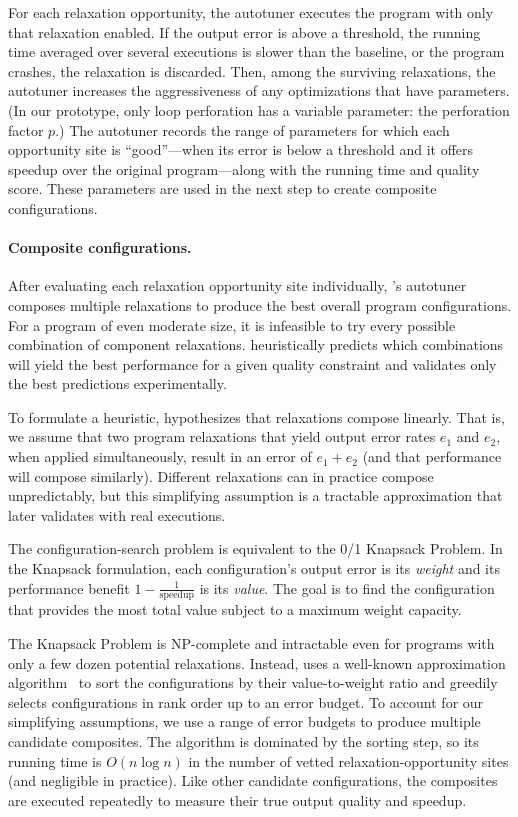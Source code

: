For each relaxation opportunity, the autotuner executes the program
with only that relaxation enabled.
If the output error is above a threshold, the running time averaged over
several executions is slower than the baseline,
or the program crashes, the relaxation is discarded.
Then, among the surviving relaxations, the autotuner increases the
aggressiveness of any optimizations that have parameters.
(In our prototype, only loop perforation has a variable
parameter: the perforation factor $p$.)
The autotuner records the range of parameters for which each opportunity site
is ``good''---when its error is below a threshold and it offers
speedup over the original program---along with the running time and
quality score.
These parameters are used in the next step to create composite configurations.

\paragraph{Composite configurations.}

After evaluating each relaxation opportunity site individually, \sysname's
autotuner composes multiple relaxations to produce the best overall
program configurations. For a program of even moderate size, it is infeasible to
try every possible combination of component relaxations.
\sysname heuristically predicts which combinations will yield the
best performance for a given quality constraint and validates only the best
predictions experimentally.

To formulate a heuristic, \sysname
hypothesizes that
relaxations compose linearly. That is, we assume that two program relaxations
that yield output error rates $e_1$ and $e_2$, when applied simultaneously,
result in an error of $e_1 + e_2$ (and that performance
will compose similarly).
Different relaxations can in practice compose unpredictably,
but this simplifying assumption is a tractable approximation that \sysname
later validates with real executions.

The configuration-search problem
is equivalent to
the 0/1 Knapsack Problem.
In the
Knapsack formulation, each configuration's output error is its \emph{weight}
and its performance benefit $1 - \frac{1}{\text{speedup}}$ is its
\emph{value}. The goal is to find the configuration that provides
the most total value subject to a maximum weight capacity.

The Knapsack Problem is NP-complete and intractable
even for programs with only a few dozen potential relaxations.
Instead, \sysname uses a well-known approximation algorithm~\cite{knapsack}
to sort the configurations by
their value-to-weight ratio and greedily selects configurations in rank order
up to an error budget.
To account for our simplifying assumptions, we use a range of error budgets to
produce multiple candidate composites.
The
algorithm is dominated by the sorting step, so its running time is
$O(n \log n)$ in the number of vetted relaxation-opportunity sites (and
negligible in practice).
%
Like other candidate configurations, the composites are executed
repeatedly to measure their true output quality and speedup.
